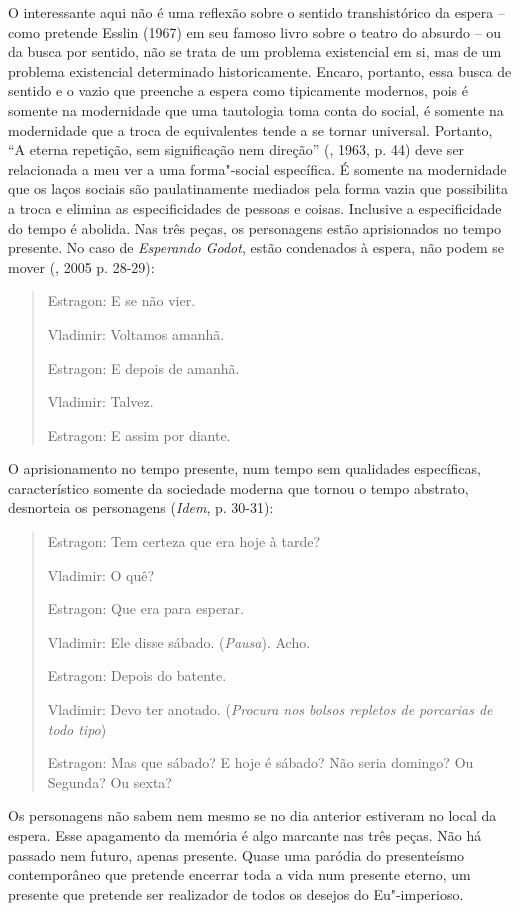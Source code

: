O interessante aqui não é uma reflexão sobre o sentido transhistórico da
espera -- como pretende Esslin (1967) em seu famoso livro sobre o teatro
do absurdo -- ou da busca por sentido, não se trata de um problema
existencial em si, mas de um problema existencial determinado
historicamente. Encaro, portanto, essa busca de sentido e o vazio que
preenche a espera como tipicamente modernos, pois é somente na
modernidade que uma tautologia toma conta do social, é somente na
modernidade que a troca de equivalentes tende a se tornar universal.
Portanto, ``A eterna repetição, sem significação nem direção'' (,
1963, p. 44) deve ser relacionada a meu ver a uma forma"-social
específica. É somente na modernidade que os laços sociais são
paulatinamente mediados pela forma vazia que possibilita a troca e
elimina as especificidades de pessoas e coisas. Inclusive a
especificidade do tempo é abolida. Nas três peças, os personagens estão
aprisionados no tempo presente. No caso de \emph{Esperando Godot}, estão condenados à espera, não podem se mover (, 2005 p. 28-29):

\begin{quote}
\forceindent{}Estragon: E se não vier.

Vladimir: Voltamos amanhã.

Estragon: E depois de amanhã.

Vladimir: Talvez.

Estragon: E assim por diante.
\end{quote}

O aprisionamento no tempo presente, num tempo sem qualidades
específicas, característico somente da sociedade moderna que tornou o
tempo abstrato, desnorteia os personagens (\emph{Idem}, p. 30-31):

\begin{quote}
\forceindent{}Estragon: Tem certeza que era hoje à tarde?

Vladimir: O quê?

Estragon: Que era para esperar.

Vladimir: Ele disse sábado. (\emph{Pausa}). Acho.

Estragon: Depois do batente.

Vladimir: Devo ter anotado. (\emph{Procura nos bolsos repletos de
porcarias de todo tipo})

Estragon: Mas que sábado? E hoje é sábado? Não seria domingo? Ou
Segunda? Ou sexta?
\end{quote}

Os personagens não sabem nem mesmo se no dia anterior estiveram no local
da espera. Esse apagamento da memória é algo marcante nas três peças.
Não há passado nem futuro, apenas presente. Quase uma paródia do
presenteísmo contemporâneo que pretende encerrar toda a vida num
presente eterno, um presente que pretende ser realizador de todos os
desejos do Eu"-imperioso.

